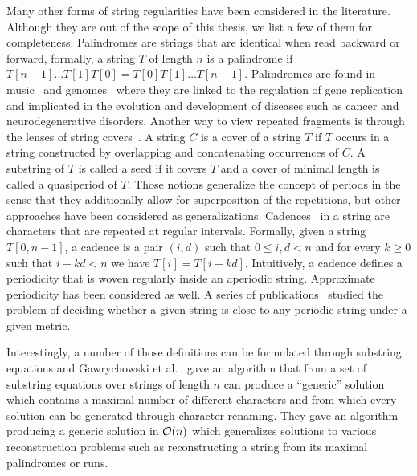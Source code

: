 Many other forms of string regularities have been considered in the literature. Although they are out of the scope of this thesis, we list a few of them for completeness.
Palindromes are strings that are identical when read backward or forward, formally, a string $T$ of length $n$ is a palindrome if $T[n-1] \dots T[1]T[0] = T[0]T[1] \dots T[n-1]$. Palindromes are found in music~\cite{tablecannon,crabcannon} and genomes~\cite{svetec2021palindromes} where they are linked to the regulation of gene replication and implicated in the evolution and development of diseases such as cancer and neurodegenerative disorders.
Another way to view repeated fragments is through the lenses of string covers~\cite{iliopoulos1996covering}. A string $C$ is a cover of a string $T$ if $T$ occurs in a string constructed by overlapping and concatenating occurrences of $C$. A substring of $T$ is called a seed if it covers $T$ and a cover of minimal length is called a quasiperiod of $T$. 
Those notions generalize the concept of periods in the sense that they additionally allow for superposition of the repetitions, but other approaches have been considered as generalizations.
Cadences~\cite{AMIR20174} in a string are characters that are repeated at regular intervals. Formally, given a string $T[0,n-1]$, a cadence is a pair $(i,d)$ such that $0 \leq i,d < n$ and for every $k \geq 0$ such that $i+kd < n$ we have $T[i] = T[i+kd]$. Intuitively, a cadence defines a periodicity that is woven regularly inside an aperiodic string.
Approximate periodicity has been considered as well. A series of publications~\cite{SIM2001557,AMIR2015215,AmirICALP2010, KociumakaRADO2018, AMIR20182} studied the problem of deciding whether a given string is close to any periodic string under a given metric.

Interestingly, a number of those definitions can be formulated through substring equations and Gawrychowski et al.~\cite{GAWRYCHOWSKI2020174} gave an algorithm that from a set of substring equations over strings of length $n$ can produce a ``generic'' solution which contains a maximal number of different characters and from which every solution can be generated through character renaming. They gave an algorithm producing a generic solution in $\mathcal{O}(n)$ which generalizes solutions to various reconstruction problems such as reconstructing a string from its maximal palindromes or runs.

